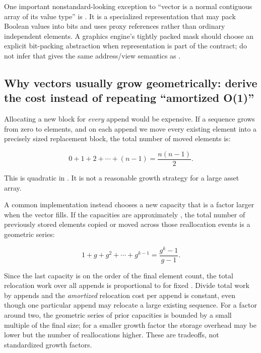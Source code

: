 One important nonstandard-looking exception to ``vector is a normal contiguous array of its value type'' is . It is a specialized representation that may pack Boolean values into bits and uses proxy references rather than ordinary independent  elements. A graphics engine's tightly packed mask should choose an explicit bit-packing abstraction when representation is part of the contract; do not infer that  gives the same address/view semantics as .

\subsection{Why vectors usually grow geometrically: derive the cost instead of repeating ``amortized O(1)''}\label{05-engine-i-ch005-why-vectors-usually-grow-geometrically-derive-the-cost-instead-of-repeating-amortized-o1}

\hypertarget{05-engine-i-ch005-why-vectors-usually-grow-geometrically-derive-the-cost-instead-of-repeating-amortized-o1}{}

Allocating a new block for \emph{every} append would be expensive. If a sequence grows from zero to  elements, and on each append we move every existing element into a precisely sized replacement block, the total number of moved elements is:

\[
0+1+2+\cdots+(n-1)=\frac{n(n-1)}{2}.
\]

This is quadratic in . It is not a reasonable growth strategy for a large asset array.

A common implementation instead chooses a new capacity that is a factor  larger when the vector fills. If the capacities are approximately , the total number of previously stored elements copied or moved across those reallocation events is a geometric series:

\[
1+g+g^2+\cdots+g^{k-1}
=\frac{g^k-1}{g-1}.
\]

Since the last capacity is on the order of the final element count, the total relocation work over all appends is proportional to  for fixed . Divide total work by  appends and the \emph{amortized} relocation cost per append is constant, even though one particular append may relocate a large existing sequence. For a factor around two, the geometric series of prior capacities is bounded by a small multiple of the final size; for a smaller growth factor the storage overhead may be lower but the number of reallocations higher. These are tradeoffs, not standardized growth factors.

